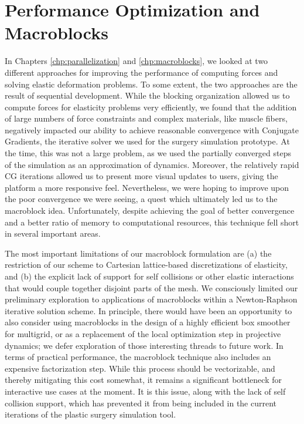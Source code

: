\section{Performance Optimization and Macroblocks}

In Chapters \ref{chp:parallelization} and \ref{chp:macroblocks}, we
looked at two different approaches for improving the performance of
computing forces and solving elastic deformation problems. To some
extent, the two approaches are the result of sequential
development. While the blocking organization allowed us to compute
forces for elasticity problems very efficiently, we found that the
addition of large numbers of force constraints and complex materials,
like muscle fibers, negatively impacted our ability to achieve
reasonable convergence with Conjugate Gradients, the iterative solver
we used for the surgery simulation prototype. At the time, this
was not a large problem, as we used the partially converged steps of
the simulation as an approximation of dynamics. Moreover, the
relatively rapid CG iterations allowed us to present more visual
updates to users, giving the platform a more responsive
feel. Nevertheless, we were hoping to improve upon the poor
convergence we were seeing, a quest which ultimately led us to the
macroblock idea. Unfortunately, despite achieving the goal of better
convergence and a better ratio of memory to computational resources,
this technique fell short in several important areas.

The most important limitations of our macroblock formulation are (a)
the restriction of our scheme to Cartesian lattice-based
discretizations of elasticity, and (b) the explicit lack of support
for self collisions or other elastic interactions that would couple
together disjoint parts of the mesh. We consciously limited our
preliminary exploration to applications of macroblocks within a
Newton-Raphson iterative solution scheme. In principle, there would
have been an opportunity to also consider using macroblocks in the
design of a highly efficient box smoother for multigrid, or as a
replacement of the local optimization step in projective dynamics; we
defer exploration of those interesting threads to future work. In
terms of practical performance, the macroblock technique also includes
an expensive factorization step. While this process should be
vectorizable, and thereby mitigating this cost somewhat, it remains a
significant bottleneck for interactive use cases at the moment. It is
this issue, along with the lack of self collision support, which has
prevented it from being included in the current iterations of the
plastic surgery simulation tool.

